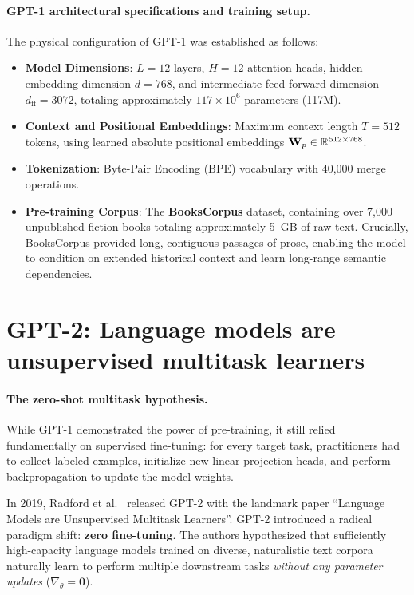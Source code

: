 \documentclass[../../main.tex]{subfiles}
\begin{document}
\paragraph{GPT-1 architectural specifications and training setup.}
The physical configuration of GPT-1 was established as follows:
\begin{itemize}
    \item \textbf{Model Dimensions}: $L = 12$ layers, $H = 12$ attention heads, hidden embedding dimension $d = 768$, and intermediate feed-forward dimension $d_{\text{ff}} = 3072$, totaling approximately $117 \times 10^6$ parameters (117M).
    \item \textbf{Context and Positional Embeddings}: Maximum context length $T = 512$ tokens, using learned absolute positional embeddings $\mathbf{W}_p \in \mathbb{R}^{512 \times 768}$.
    \item \textbf{Tokenization}: Byte-Pair Encoding (BPE) vocabulary with 40,000 merge operations.
    \item \textbf{Pre-training Corpus}: The \textbf{BooksCorpus} dataset, containing over 7,000 unpublished fiction books totaling approximately 5~GB of raw text. Crucially, BooksCorpus provided long, contiguous passages of prose, enabling the model to condition on extended historical context and learn long-range semantic dependencies.
\end{itemize}

\section{GPT-2: Language models are unsupervised multitask learners}
\label{sec:gpt2_architecture}

\paragraph{The zero-shot multitask hypothesis.}
While GPT-1 demonstrated the power of pre-training, it still relied fundamentally on supervised fine-tuning: for every target task, practitioners had to collect labeled examples, initialize new linear projection heads, and perform backpropagation to update the model weights.

In 2019, Radford et al.~\cite{radford2019} released GPT-2 with the landmark paper ``Language Models are Unsupervised Multitask Learners''. GPT-2 introduced a radical paradigm shift: \textbf{zero fine-tuning}. The authors hypothesized that sufficiently high-capacity language models trained on diverse, naturalistic text corpora naturally learn to perform multiple downstream tasks \emph{without any parameter updates} ($\nabla_\theta = \mathbf{0}$).
\end{document}
